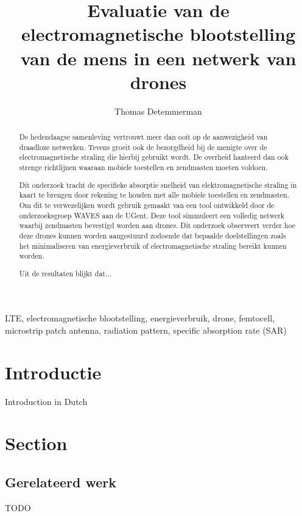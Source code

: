 \documentclass[twocolumn]{phdsymp} %
\begin{document}
\title{	Evaluatie van de electromagnetische blootstelling van de mens in een netwerk van drones}

\author{Thomas Detemmerman}


\maketitle

\begin{abstract}
De hedendaagse samenleving vertrouwt meer dan ooit op de aanwezigheid van draadloze netwerken. 
Tevens groeit ook de bezorgdheid bij de menigte over de electromagnetische straling die hierbij gebruikt wordt. De overheid hanteerd dan ook
strenge richtlijnen waaraan mobiele toestellen en zendmasten moeten voldoen.

Dit onderzoek tracht de specifieke absorptie snelheid van elektromagnetische straling in kaart te brengen door rekening te houden met alle mobiele 
toestellen en zendmasten. Om dit te verwezelijken wordt gebruik gemaakt van een tool ontwikkeld door de onderzoeksgroep WAVES aan de UGent. Deze tool
simmuleert een volledig netwerk waarbij zendmasten bevestigd worden aan drones. Dit onderzoek observeert verder hoe deze drones kunnen worden aangestuurd
zodoende dat bepaalde doelstellingen zoals het minimaliseren van energieverbruik of electromagnetische straling bereikt kunnen worden.

Uit de resultaten blijkt dat...
\end{abstract}

\begin{keywords}
LTE, electromagnetische blootstelling, energieverbruik, drone, femtocell, microstrip patch antenna, radiation pattern, specific absorption rate (SAR)
\end{keywords}

\section{Introductie}
Introduction in Dutch

\section{Section}

\subsection{Gerelateerd werk}
TODO
\end{document}
